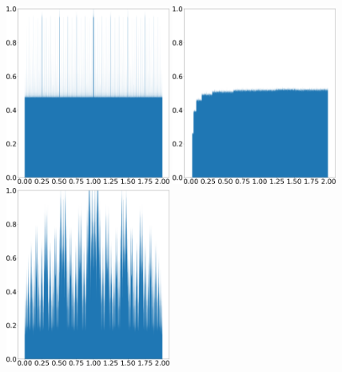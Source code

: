 \begin{figure}
    \centering
    \includegraphics[width=0.48\textwidth]{figure/tent_squashed_shadow_density_0.01.png}
    \hspace{0.02\textwidth}
    \includegraphics[width=0.48\textwidth]{figure/tent_squashed_physical_density_0.01.png}
    \\ \vspace{0.02\textwidth}
    \includegraphics[width=0.48\textwidth]{figure/tent_squashed_shadow_density_0.2.png}
    \hspace{0.02\textwidth}

\end{figure}
